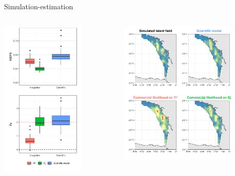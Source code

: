\documentclass[
  10pt,
  ignorenonframetext,
]{beamer}
\begin{document}
\begin{frame}{Simulation-estimation}
\protect\hypertarget{simulation-estimation}{}

\center

\begin{columns}
\begin{column}{0.4\textwidth}

\center
\includegraphics[width=4cm]{images/res_simu_plot.png}

\end{column}

\begin{column}{0.6\textwidth}
\center

\includegraphics[width=5.5cm]{images/map_simu_plot.png}
\vspace{\baselineskip}

\end{column}

\end{columns}

\end{frame}
\end{document}
